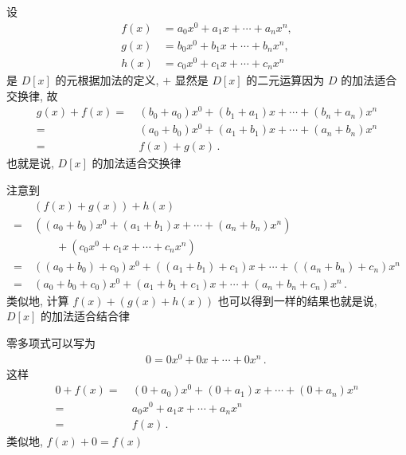 \begin{pf}
    设
    \begin{align*}
        f(x) & = a_0 x^0 + a_1 x + \cdots + a_n x^n, \\
        g(x) & = b_0 x^0 + b_1 x + \cdots + b_n x^n, \\
        h(x) & = c_0 x^0 + c_1 x + \cdots + c_n x^n
    \end{align*}
    是 $D[x]$ 的元\period 根据加法的定义, $+$ 显然是 $D[x]$ 的二元运算\period 因为 $D$ 的加法适合交换律, 故
    \begin{align*}
        g(x) + f(x)
        = \  & (b_0 + a_0) x^0 + (b_1 + a_1) x + \cdots + (b_n + a_n) x^n \\
        = \  & (a_0 + b_0) x^0 + (a_1 + b_1) x + \cdots + (a_n + b_n) x^n \\
        = \  & f(x) + g(x) \period
    \end{align*}
    也就是说, $D[x]$ 的加法适合交换律\period

    注意到
    \begin{align*}
             & (f(x) + g(x)) + h(x)                                                                 \\
        = \  & ((a_0 + b_0) x^0 + (a_1 + b_1) x + \cdots + (a_n + b_n) x^n)                         \\
             & \qquad + (c_0 x^0 + c_1 x + \cdots + c_n x^n)                                        \\
        = \  & ((a_0 + b_0) + c_0) x^0 + ((a_1 + b_1) + c_1) x + \cdots + ((a_n + b_n) + c_n) x^n   \\
        = \  & (a_0 + b_0 + c_0) x^0 + (a_1 + b_1 + c_1) x + \cdots + (a_n + b_n + c_n) x^n \period
    \end{align*}
    类似地, 计算 $f(x) + (g(x) + h(x))$ 也可以得到一样的结果\period 也就是说, $D[x]$ 的加法适合结合律\period

    零多项式可以写为
    \begin{align*}
        0 = 0x^0 + 0x + \cdots + 0x^n \period
    \end{align*}
    这样
    \begin{align*}
        0 + f(x)
        = \  & (0 + a_0) x^0 + (0 + a_1) x + \cdots + (0 + a_n) x^n \\
        = \  & a_0 x^0 + a_1 x + \cdots + a_n x^n                   \\
        = \  & f(x) \period
    \end{align*}
    类似地, $f(x) + 0 = f(x)$\period


\end{pf}
